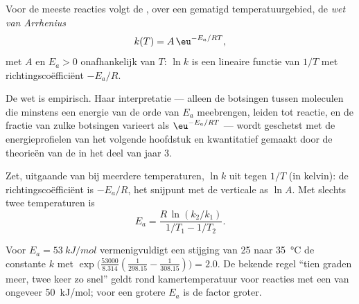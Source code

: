 \begin{theorem}\label{thm:b1:rate-laws:arrhenius}
Voor de meeste reacties volgt de , over een gematigd
temperatuurgebied, de \emph{wet van Arrhenius}
\[
  k(T) = A\,\eu^{-E_a/RT} ,
\]
met $A$ en $E_a > 0$ onafhankelijk van $T$: $\ln k$ is een lineaire
functie van $1/T$ met richtingscoëfficiënt $-E_a/R$.
\end{theorem}
\admitted

\begin{remark}\label{rem:b1:rate-laws:meaning}
De wet is empirisch. Haar interpretatie --- alleen de botsingen tussen
moleculen die minstens een energie van de orde van $E_a$ meebrengen,
leiden tot reactie, en de fractie van zulke botsingen varieert als
$\eu^{-E_a/RT}$ --- wordt geschetst met de energieprofielen van het
volgende hoofdstuk en kwantitatief gemaakt door de theorieën van de
 in het deel van jaar 3.
\end{remark}

\begin{method}[$E_a$ bepalen]\label{met:b1:rate-laws:arrhenius-plot}
Zet, uitgaande van  bij meerdere temperaturen, $\ln k$
uit tegen $1/T$ (in kelvin): de richtingscoëfficiënt is $-E_a/R$, het
snijpunt met de verticale as $\ln A$. Met slechts twee temperaturen is
\[
  E_a = \frac{R\,\ln(k_2/k_1)}{1/T_1 - 1/T_2} .
\]
\end{method}

\begin{example}\label{ex:b1:rate-laws:doubling}
Voor $E_a = \qty{53}{kJ/mol}$ vermenigvuldigt een stijging van 25 naar
\qty{35}{\celsius} de constante $k$ met $\exp\!\big(\frac{53000}{8.314}(\frac{1}{298.15} -
\frac{1}{308.15})\big) = 2.0$. De bekende regel ``tien graden meer, twee
keer zo snel'' geldt rond kamertemperatuur voor reacties met een
 van ongeveer \qty{50}{kJ/mol}; voor een grotere $E_a$
is de factor groter.
\end{example}

